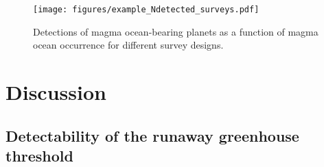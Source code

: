 \documentclass[modern]{aastex631}
\begin{document}
\begin{figure}[ht!]
    \begin{centering}

        \texttt{[image: figures/example\_Ndetected\_surveys.pdf]}
        \caption{
        Detections of magma ocean-bearing planets as a function of magma ocean occurrence for different survey designs.
        }
        \label{fig:example_Ndetected_surveys}
    \end{centering}
\end{figure}

\section{Discussion}\label{sec:discussion}
\subsection{Detectability of the runaway greenhouse threshold}
\end{document}
